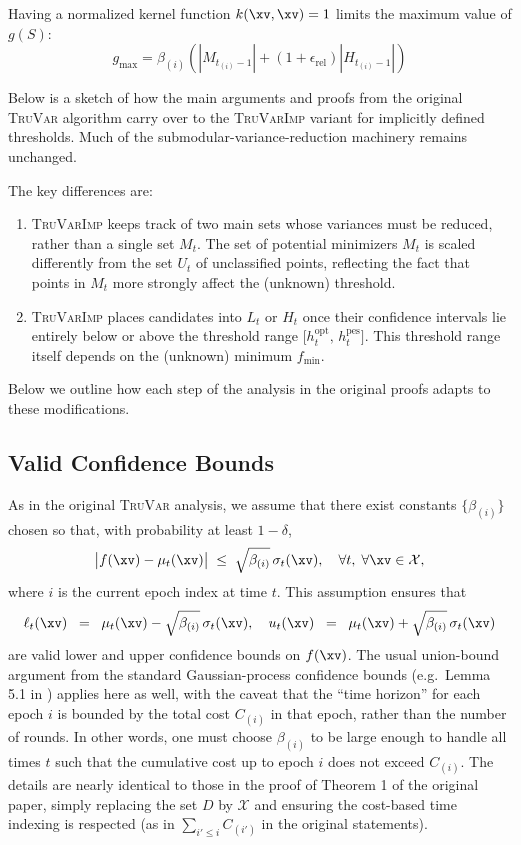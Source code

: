 \documentclass[a4paper,10pt]{article}
\newcommand{\TruVar}{\textsc{TruVar}\xspace}
\newcommand{\TruVarImp}{\textsc{TruVarImp}\xspace}
\newcommand{\cset}{\mathcal{X}}
\begin{document}
Having a normalized kernel function $k(\xv, \xv) = 1$ limits the maximum value of $g(S)$:
\begin{equation}
    g_{\mathrm{max}} = \beta_{(i)}\left(|M_{t_{(i)}-1}| + (1 + \epsilon_{\mathrm{rel}})|H_{t_{(i)}-1}|\right)
\end{equation}









Below is a sketch of how the main arguments and proofs from the original \TruVar algorithm carry over to the \TruVarImp variant for implicitly defined thresholds.
Much of the submodular-variance-reduction machinery remains unchanged.

The key differences are:

\begin{enumerate}
    \item \TruVarImp keeps track of two main sets whose variances must be reduced, rather than a single set $M_t$.
    The set of potential minimizers $M_t$ is scaled differently from the set $U_t$ of unclassified points, reflecting the fact that points in $M_t$ more strongly affect the (unknown) threshold.
    \item \TruVarImp places candidates into $L_t$ or $H_t$ once their confidence intervals lie entirely below or above the threshold range $\bigl[h_t^\mathrm{opt},\,h_t^\mathrm{pes}\bigr]$.
    This threshold range itself depends on the (unknown) minimum $f_{\mathrm{min}}$.
\end{enumerate}
Below we outline how each step of the analysis in the original proofs adapts to these modifications.

\subsection{Valid Confidence Bounds}

As in the original \TruVar analysis, we assume that there exist constants $\{\beta_{(i)}\}$ chosen so that, with probability at least $1-\delta$,
\[
    \bigl\lvert f(\xv) - \mu_t(\xv)\bigr\rvert
    \; \le \;
    \sqrt{\beta_{(i)}}\, \sigma_t(\xv),
    \quad \forall t,\;\forall \xv \in \cset,
\]
where $i$ is the current epoch index at time $t$.
This assumption ensures that
\[
    \ell_t(\xv) \;\;=\;\; \mu_t(\xv) - \sqrt{\beta_{(i)}}\,\sigma_t(\xv),
    \quad
    u_t(\xv) \;\;=\;\; \mu_t(\xv) + \sqrt{\beta_{(i)}}\,\sigma_t(\xv)
\]
are valid lower and upper confidence bounds on $f(\xv)$.
The usual union-bound argument from the standard Gaussian-process confidence bounds (e.g.\ Lemma 5.1 in \citet{Sri12}) applies here as well, with the caveat that the \enquote{time horizon} for each epoch $i$ is bounded by the total cost $C_{(i)}$ in that epoch, rather than the number of rounds.
In other words, one must choose $\beta_{(i)}$ to be large enough to handle all times $t$ such that the cumulative cost up to epoch $i$ does not exceed $C_{(i)}$.
The details are nearly identical to those in the proof of Theorem 1 of the original paper, simply replacing the set $D$ by $\cset$ and ensuring the cost-based time indexing is respected (as in $\sum_{i'\le i} C_{(i')}$ in the original statements).
\end{document}
